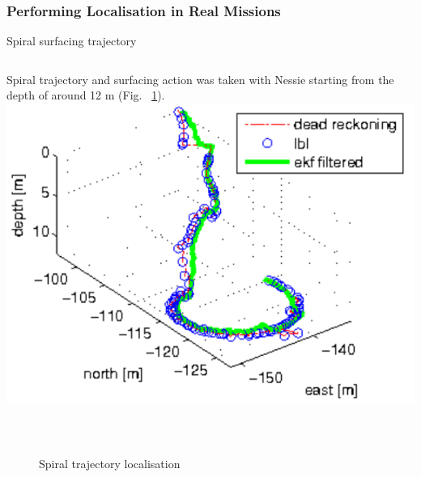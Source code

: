 \begin{frame}\frametitle{Performing Localisation in Real Missions}
\begin{block}{Spiral surfacing trajectory}
\begin{columns}
Spiral trajectory and surfacing action was taken with Nessie starting from the depth of around 12 m (Fig. ~\ref{fig:spiral}). %
\centering
\includegraphics[width=0.7\linewidth]{fig/spiral3d.pdf}
\end{columns}
\end{block} 
\centering 
\begin{figure}
\vspace{-15pt}
\caption{Spiral trajectory localisation}
\vspace{-15pt}
 \\
\label{fig:spiral}
\end{figure}
\end{frame}